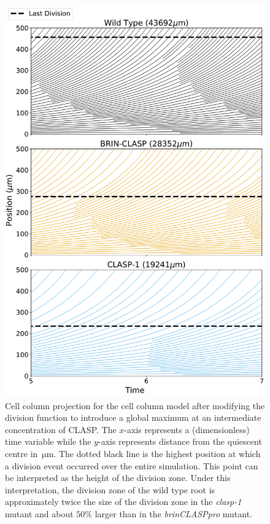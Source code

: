 \documentclass[referee,pdflatex,sn-mathphys-num]{sn-jnl}
\newcommand{\um}{\,\unit{\micro\metre}}
\begin{document}
\begin{appendices}
\begin{figure}[!htp]
  \centering
  \includegraphics[height=480pt]{column-modified-profile.pdf}
  \caption{Cell column projection for the cell column model after modifying the division function to introduce a global maximum at an intermediate concentration of CLASP. The $x$-axis represents a (dimensionless) time variable while the $y$-axis represents distance from the quiescent centre in $\um$. The dotted black line is the highest position at which a division event occurred over the entire simulation. This point can be interpreted as the height of the division zone. Under this interpretation, the division zone of the wild type root is approximately twice the size of the division zone in the \emph{clasp-1} mutant and about $50\%$ larger than in the \emph{brinCLASPpro} mutant.}
  \label{column-modified-profile}
\end{figure}


\end{appendices}
\end{document}
